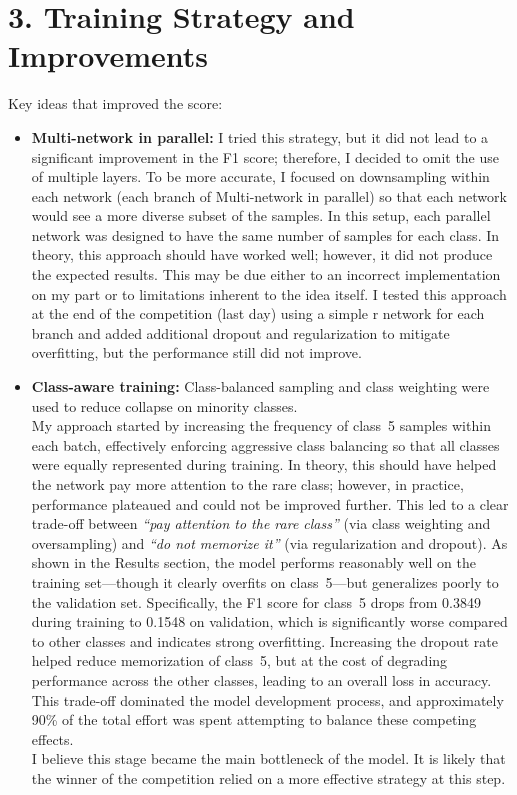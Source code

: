 \documentclass[11pt]{article}
\begin{document}
\section*{3. Training Strategy and Improvements}
Key ideas that improved the score:
\begin{itemize}[leftmargin=1.2em]
\item \textbf{Multi-network in parallel:} I tried this strategy, but it did not lead to a significant improvement in the F1 score; therefore, I decided to omit the use of multiple layers. To be more accurate, I focused on downsampling within each network (each branch of Multi-network in parallel) so that each network would see a more diverse subset of the samples. In this setup, each parallel network was designed to have the same number of samples for each class. In theory, this approach should have worked well; however, it did not produce the expected results. This may be due either to an incorrect implementation on my part or to limitations inherent to the idea itself. I tested this approach at the end of the competition (last day) using a simple r network for each branch and added additional dropout and regularization to mitigate overfitting, but the performance still did not improve.
\item \textbf{Class-aware training:} Class-balanced sampling and class weighting were used to reduce collapse on minority classes.\\ My approach started by increasing the frequency of class~5 samples within each batch, effectively enforcing aggressive class balancing so that all classes were equally represented during training. In theory, this should have helped the network pay more attention to the rare class; however, in practice, performance plateaued and could not be improved further. This led to a clear trade-off between \emph{“pay attention to the rare class”} (via class weighting and oversampling) and \emph{“do not memorize it”} (via regularization and dropout). As shown in the Results section, the model performs reasonably well on the training set—though it clearly overfits on class~5—but generalizes poorly to the validation set. Specifically, the F1 score for class~5 drops from 0.3849 during training to 0.1548 on validation, which is significantly worse compared to other classes and indicates strong overfitting. Increasing the dropout rate helped reduce memorization of class~5, but at the cost of degrading performance across the other classes, leading to an overall loss in accuracy. This trade-off dominated the model development process, and approximately 90\% of the total effort was spent attempting to balance these competing effects.\\
I believe this stage became the main bottleneck of the model. It is likely that the winner of the competition relied on a more effective strategy at this step.\\


\end{itemize}
\end{document}
